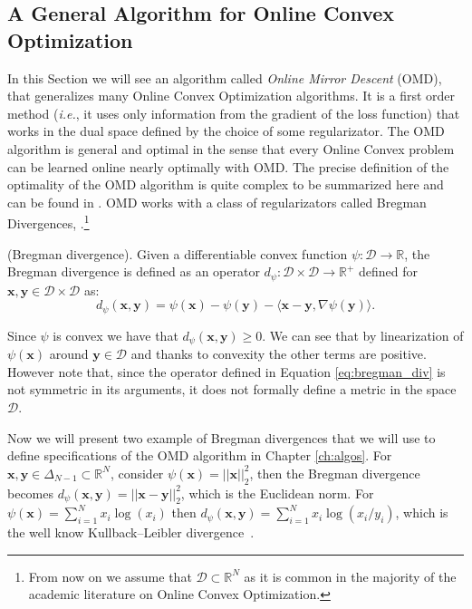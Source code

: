 \subsection{A General Algorithm for Online Convex Optimization}\label{sec:OMD}

In this Section we will see an algorithm called \emph{Online Mirror Descent} (OMD), that generalizes many Online Convex Optimization algorithms. It is a first order method (\emph{i.e.}, it uses only information from the gradient of the loss function) that works in the dual space defined by the choice of some regularizator. The OMD algorithm is general and optimal in the sense that every Online Convex problem can be learned online nearly optimally with OMD. The precise definition of the optimality of the OMD algorithm is quite complex to be summarized here and can be found in \cite{srebro2011universality}.
OMD works with a class of regularizators called Bregman Divergences, \cite{banerjee2005clustering}.\footnote{From now on we assume that $\mathcal D\subset \mathbb R^N$ as it is common in the majority of the academic literature on Online Convex Optimization.}

\begin{definition}(Bregman divergence). Given a differentiable convex function $\psi:\mathcal D\to\mathbb R$, the Bregman divergence is defined as an operator $d_{\psi}:\mathcal D\times\mathcal D\to \mathbb R^+$ defined for $\mathbf x,\mathbf y\in\mathcal D\times\mathcal D$ as: 
\begin{equation}\label{eq:bregman_div}
d_\psi(\mathbf x,\mathbf y)=\psi(\mathbf x)-\psi(\mathbf y)-\langle \mathbf x-\mathbf y,\nabla \psi(\mathbf y)\rangle.
\end{equation}
\end{definition}

Since $\psi$ is convex we have that $d_\psi(\mathbf x,\mathbf y)\ge0$. We can see that by linearization of $\psi(\mathbf x)$ around $\mathbf y\in\mathcal D$ and thanks to convexity the other terms are positive. However note that, since the operator defined in Equation \eqref{eq:bregman_div} is not symmetric in its arguments, it does not formally define a metric in the space $\mathcal D$.

Now we will present two example of Bregman divergences that we will use to define specifications of the OMD algorithm in Chapter \ref{ch:algos}.
For $\mathbf x,\mathbf y\in\Delta_{N-1}\subset \mathbb R^N$, consider $\psi(\mathbf x)=||\mathbf x||_2^2$, then the Bregman divergence becomes $d_\psi(\mathbf x,\mathbf y)=||\mathbf x-\mathbf y||_2^2$, which is the Euclidean norm. For $\psi(\mathbf x)=\sum\limits_{i=1}^Nx_i\log(x_i)$ then $d_\psi(\mathbf x,\mathbf y)=\sum\limits_{i=1}^Nx_i\log(x_i/y_i)$, which is the well know Kullback–Leibler divergence~\cite{van2014renyi}.

